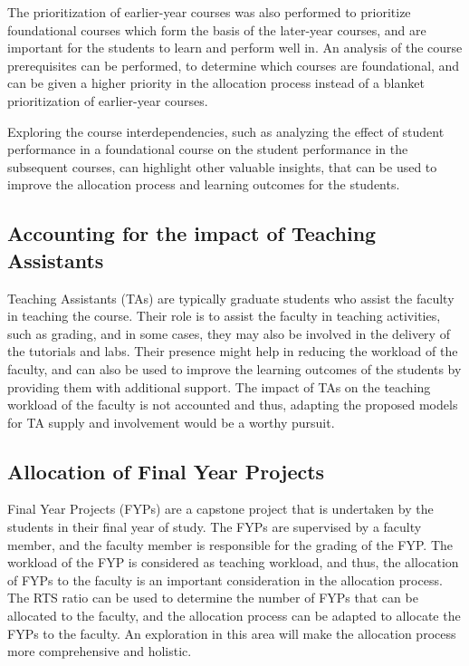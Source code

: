 The prioritization of earlier-year courses was also performed to prioritize foundational courses which form the basis of the later-year courses, and are important for the students to learn and perform well in. An analysis of the course prerequisites can be performed, to determine which courses are foundational, and can be given a higher priority in the allocation process instead of a blanket prioritization of earlier-year courses.

Exploring the course interdependencies, such as analyzing the effect of student performance in a foundational course on the student performance in the subsequent courses, can highlight other valuable insights, that can be used to improve the allocation process and learning outcomes for the students.

\subsection{Accounting for the impact of Teaching Assistants}

Teaching Assistants (TAs) are typically graduate students who assist the faculty in teaching the course. Their role is to assist the faculty in teaching activities, such as grading, and in some cases, they may also be involved in the delivery of the tutorials and labs. Their presence might help in reducing the workload of the faculty, and can also be used to improve the learning outcomes of the students by providing them with additional support. The impact of TAs on the teaching workload of the faculty is not accounted and thus, adapting the proposed models for TA supply and involvement would be a worthy pursuit.

\subsection{Allocation of Final Year Projects}

Final Year Projects (FYPs) are a capstone project that is undertaken by the students in their final year of study. The FYPs are supervised by a faculty member, and the faculty member is responsible for the grading of the FYP. The workload of the FYP is considered as teaching workload, and thus, the allocation of FYPs to the faculty is an important consideration in the allocation process. The RTS ratio can be used to determine the number of FYPs that can be allocated to the faculty, and the allocation process can be adapted to allocate the FYPs to the faculty. An exploration in this area will make the allocation process more comprehensive and holistic.

